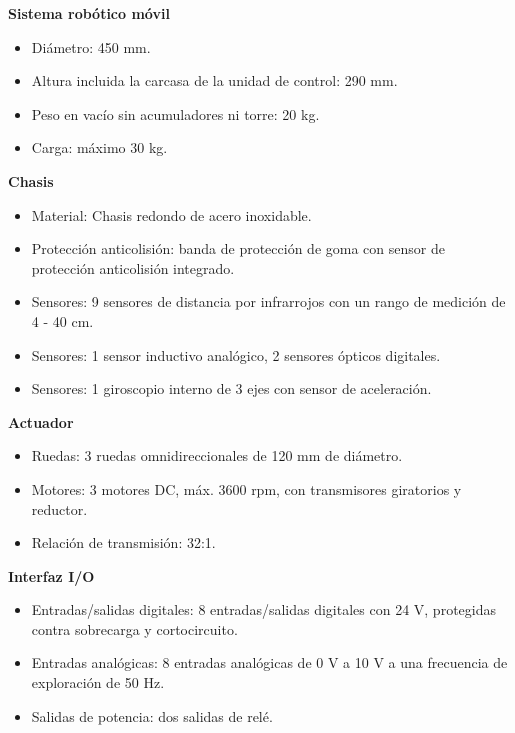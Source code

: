             \textbf{Sistema robótico móvil}
            \begin{itemize}
                \item Diámetro: 450 mm.
                \item Altura incluida la carcasa de la unidad de control: 290 mm.
                \item Peso en vacío sin acumuladores ni torre: 20 kg.
                \item Carga: máximo 30 kg.
            \end{itemize}
            
            \phantom{saltodelineaforzado >:D\\}
            
            \textbf{Chasis}
            \begin{itemize}
                \item Material: Chasis redondo de acero inoxidable.
                \item Protección anticolisión: banda de protección de goma con sensor de protección anticolisión integrado.
                \item Sensores: 9 sensores de distancia por infrarrojos con un rango de medición de 4 - 40 cm.
                \item Sensores: 1 sensor inductivo analógico, 2 sensores ópticos digitales.
                \item Sensores: 1 giroscopio interno de 3 ejes con sensor de aceleración.
            \end{itemize}\newpage
            
            \textbf{Actuador}
            \begin{itemize}
                \item Ruedas: 3 ruedas omnidireccionales de 120 mm de diámetro.
                \item Motores: 3 motores DC, máx. 3600 rpm, con transmisores giratorios y reductor.
                \item Relación de transmisión: 32:1.
            \end{itemize}

            \phantom{saltodelineaforzado >:D\\}
            
            \textbf{Interfaz I/O}
            \begin{itemize}
                \item Entradas/salidas digitales: 8 entradas/salidas digitales con 24 V, protegidas contra sobrecarga y cortocircuito.
                \item Entradas analógicas: 8 entradas analógicas de 0 V a 10 V a una frecuencia de exploración de 50 Hz.
                \item Salidas de potencia: dos salidas de relé.
            \end{itemize}

